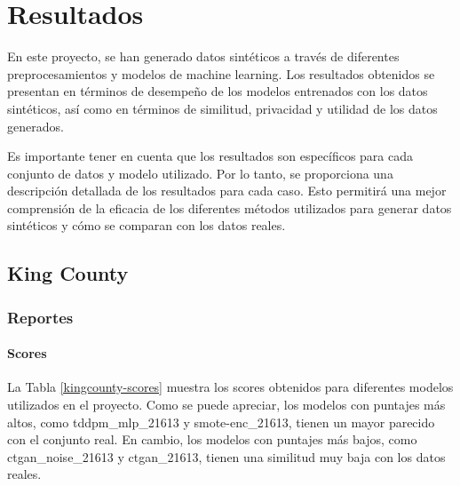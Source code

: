 \chapter{Resultados}
En este proyecto, se han generado datos sintéticos a través de diferentes preprocesamientos y modelos de machine learning. Los resultados obtenidos se presentan en términos de desempeño de los modelos entrenados con los datos sintéticos, así como en términos de similitud, privacidad y utilidad de los datos generados.

Es importante tener en cuenta que los resultados son específicos para cada conjunto de datos y modelo utilizado. Por lo tanto, se proporciona una descripción detallada de los resultados para cada caso. Esto permitirá una mejor comprensión de la eficacia de los diferentes métodos utilizados para generar datos sintéticos y cómo se comparan con los datos reales.

\newpage
\section{King County}

\subsection{Reportes}

\subsubsection{Scores}

La Tabla \ref{kingcounty-scores} muestra los scores obtenidos para diferentes modelos utilizados en el proyecto. Como se puede apreciar, los modelos con puntajes más altos, como tddpm\_mlp\_21613 y smote-enc\_21613, tienen un mayor parecido con el conjunto real. En cambio, los modelos con puntajes más bajos, como ctgan\_noise\_21613 y ctgan\_21613, tienen una similitud muy baja con los datos reales.

